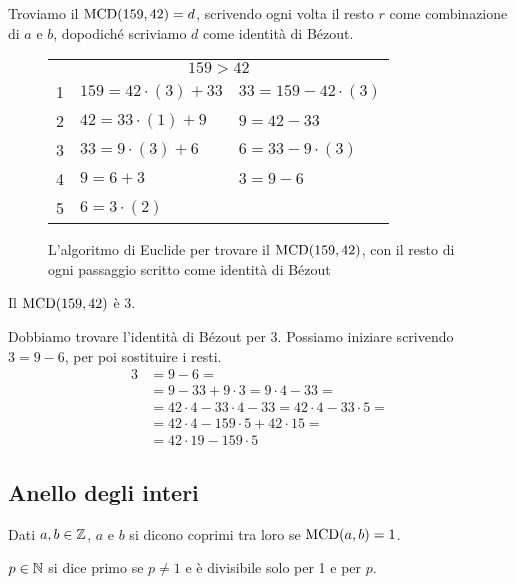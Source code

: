 \begin{exmp}
Troviamo il $\operatorname{MCD}(159, 42) = d$, scrivendo ogni volta il resto $r$ come combinazione di $a$ e $b$, dopodich\'e scriviamo $d$ come identit\`a di B\'ezout.

\begin{figure}[ht]
\centering
\begin{tabular}{*{3}{l}}
\multicolumn{3}{c}{$159 > 42$} \\
1 & $159 = 42 \cdot (3) + 33$     & $33 = 159 - 42 \cdot (3)$ \\ 
2 & $42 = 33 \cdot (1) + 9$       & $9 = 42 - 33$ \\
3 & $33 = 9 \cdot (3) + 6$        & $6 = 33 - 9 \cdot (3)$ \\
4 & $9 = 6 + 3$             & $3 = 9 - 6$ \\
5 & $6 = 3 \cdot (2)$ & \
\end{tabular}
\caption{\label{itm:esempio_algoritmo_euclide}L'algoritmo di Euclide per trovare il $\operatorname{MCD}(159, 42)$, con il resto di ogni passaggio scritto come identit\`a di B\'ezout}
\end{figure}

Il $\operatorname{MCD}(159, 42) $ \`e $ 3$.

Dobbiamo trovare l'identit\`a di B\'ezout per 3. Possiamo iniziare scrivendo $3 = 9 - 6$, per poi sostituire i resti.
\begin{align*}
3 &= 9 - 6 = \\
&= 9 - 33 + 9 \cdot 3 = 9 \cdot 4 - 33 = \\
&= 42 \cdot 4 - 33 \cdot 4 - 33 = 42 \cdot 4 - 33 \cdot 5 = \\
&= 42 \cdot 4 - 159 \cdot 5 + 42 \cdot 15 = \\
&= 42 \cdot 19 - 159 \cdot 5
\end{align*}
\end{exmp}

\subsection{Anello degli interi}

\begin{defn}
Dati $a, b \in \mathbb{Z}$, $a$ e $b$ si dicono coprimi tra loro se $\operatorname{MCD}(a,b) = 1$.
\end{defn}
\begin{defn}
$p \in \mathbb{N}$ si dice primo se $p \neq 1$ e \`e divisibile solo per 1 e per $p$.
\end{defn}

